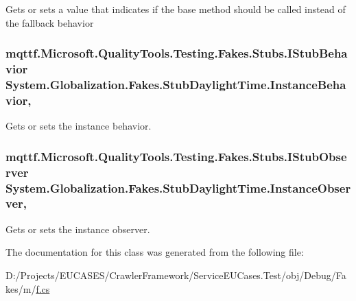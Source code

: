 Gets or sets a value that indicates if the base method should be called instead of the fallback behavior

\hypertarget{class_system_1_1_globalization_1_1_fakes_1_1_stub_daylight_time_a5986bb5db0c6c01b2e9795787b86f257}{
\subsubsection[{Instance\-Behavior}]{\setlength{\rightskip}{0pt plus 5cm}mqttf.\-Microsoft.\-Quality\-Tools.\-Testing.\-Fakes.\-Stubs.\-I\-Stub\-Behavior System.\-Globalization.\-Fakes.\-Stub\-Daylight\-Time.\-Instance\-Behavior\hspace{0.3cm}{\ttfamily [get]}, {\ttfamily [set]}}}\label{class_system_1_1_globalization_1_1_fakes_1_1_stub_daylight_time_a5986bb5db0c6c01b2e9795787b86f257}


Gets or sets the instance behavior.

\hypertarget{class_system_1_1_globalization_1_1_fakes_1_1_stub_daylight_time_ac676cb6e24eaef8da7e6872f5f9ded44}{
\subsubsection[{Instance\-Observer}]{\setlength{\rightskip}{0pt plus 5cm}mqttf.\-Microsoft.\-Quality\-Tools.\-Testing.\-Fakes.\-Stubs.\-I\-Stub\-Observer System.\-Globalization.\-Fakes.\-Stub\-Daylight\-Time.\-Instance\-Observer\hspace{0.3cm}{\ttfamily [get]}, {\ttfamily [set]}}}\label{class_system_1_1_globalization_1_1_fakes_1_1_stub_daylight_time_ac676cb6e24eaef8da7e6872f5f9ded44}


Gets or sets the instance observer.



The documentation for this class was generated from the following file\-:\begin{DoxyCompactItemize}
\item 
D\-:/\-Projects/\-E\-U\-C\-A\-S\-E\-S/\-Crawler\-Framework/\-Service\-E\-U\-Cases.\-Test/obj/\-Debug/\-Fakes/m/\hyperlink{m_2f_8cs}{f.\-cs}\end{DoxyCompactItemize}
